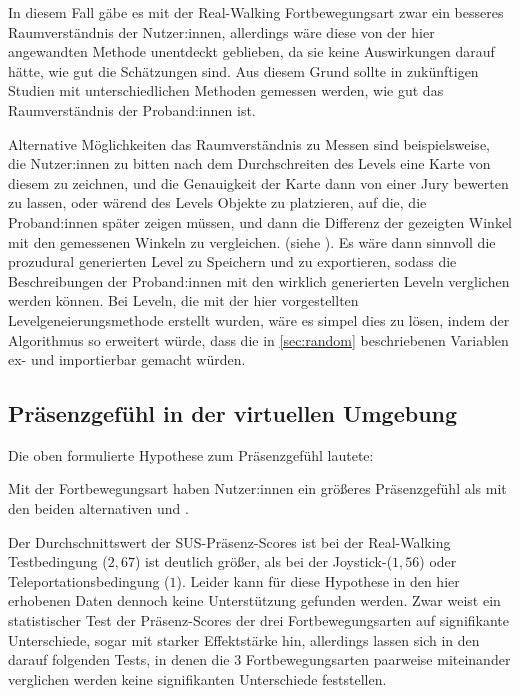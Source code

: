             In diesem Fall gäbe es mit der Real-Walking Fortbewegungsart zwar ein besseres Raumverständnis der Nutzer:innen, allerdings wäre diese von der hier angewandten Methode unentdeckt geblieben, da sie keine Auswirkungen darauf hätte, wie gut die Schätzungen sind. Aus diesem Grund sollte in zukünftigen Studien mit unterschiedlichen Methoden gemessen werden, wie gut das Raumverständnis der Proband:innen ist.

            Alternative Möglichkeiten das Raumverständnis zu Messen sind beispielsweise, die Nutzer:innen zu bitten nach dem Durchschreiten des Levels eine Karte von diesem zu zeichnen, und die Genauigkeit der Karte dann von einer Jury bewerten zu lassen, oder wärend des Levels Objekte zu platzieren, auf die, die Proband:innen später zeigen müssen, und dann die Differenz der gezeigten Winkel mit den gemessenen Winkeln zu vergleichen. (siehe \cite{peck-vergleich-2011, langbehn-vergleich-2018}). Es wäre dann sinnvoll die prozudural generierten Level zu Speichern und zu exportieren, sodass die Beschreibungen der Proband:innen mit den wirklich generierten Leveln verglichen werden können. Bei Leveln, die mit der hier vorgestellten Levelgeneierungsmethode erstellt wurden, wäre es simpel dies zu lösen, indem der Algorithmus so erweitert würde, dass die in \autoref{sec:random} beschriebenen Variablen ex- und importierbar gemacht würden.

        \subsection{Präsenzgefühl in der virtuellen Umgebung}
            Die oben formulierte Hypothese zum Präsenzgefühl lautete:

            Mit der  Fortbewegungsart haben Nutzer:innen ein größeres Präsenzgefühl als mit den beiden alternativen  und .

            Der Durchschnittswert der SUS-Präsenz-Scores ist bei der Real-Walking Testbedingung ($2,67$) ist deutlich größer, als bei der Joystick-($1,56$) oder Teleportationsbedingung ($1$).
            Leider kann für diese Hypothese in den hier erhobenen Daten dennoch keine Unterstützung gefunden werden. Zwar weist ein statistischer Test der Präsenz-Scores der drei Fortbewegungsarten auf signifikante Unterschiede, sogar mit starker Effektstärke hin, allerdings lassen sich in den darauf folgenden Tests, in denen die 3 Fortbewegungsarten paarweise miteinander verglichen werden keine signifikanten Unterschiede feststellen.

